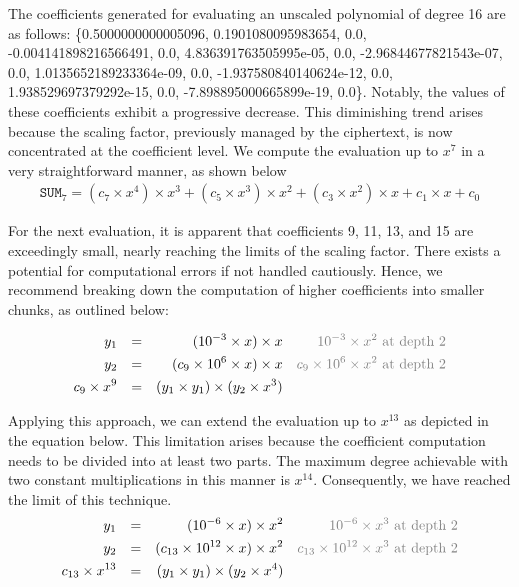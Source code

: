 \documentclass[journal=tosc,final]{iacrtrans}
\begin{document}
The coefficients generated for evaluating an unscaled polynomial of degree 16 are as follows: \{0.5000000000005096, 0.1901080095983654, 0.0, -0.004141898216566491, 0.0, 4.836391763505995e-05, 0.0, -2.96844677821543e-07, 0.0, 1.0135652189233364e-09, 0.0, -1.937580840140624e-12, 0.0, 1.938529697379292e-15, 0.0, -7.898895000665899e-19, 0.0\}. Notably, the values of these coefficients exhibit a progressive decrease. This diminishing trend arises because the scaling factor, previously managed by the ciphertext, is now concentrated at the coefficient level. We compute the evaluation up to $x^7$ in a very straightforward manner, as shown below
\begin{align}
     \texttt{SUM}_7 = (c_7\times x^4)\times x^3 +(c_5\times x^3)\times x^2 +(c_3\times x^2)\times x + c_1\times x+ c_0 
\end{align}

For the next evaluation, it is apparent that coefficients 9, 11, 13, and 15 are exceedingly small, nearly reaching the limits of the scaling factor. There exists a potential for computational errors if not handled cautiously. Hence, we recommend breaking down the computation of higher coefficients into smaller chunks, as outlined below:

\begin{align}
    y_1 && = && (10^{-3}\times x )\times x && \text{\textcolor{gray}{$10^{-3}\times x^2$ at depth 2}}\\
    y_2 && = && (c_9\times 10^{6} \times x )\times x && \text{\textcolor{gray}{$c_9 \times 10^{6}\times x^2$ at depth 2}}\\
    c_9\times x^9 && = && (y_1\times y_1) \times (y_2\times x^3) &&
\end{align}

Applying this approach, we can extend the evaluation up to $x^{13}$ as depicted in the equation below. This limitation arises because the coefficient computation needs to be divided into at least two parts. The maximum degree achievable with two constant multiplications in this manner is $x^{14}$. Consequently, we have reached the limit of this technique. 
\begin{align}
    y_1 && = && (10^{-6}\times x )\times x^2 && \text{\textcolor{gray}{$10^{-6}\times x^3$ at depth 2}}\\
    y_2 && = && (c_{13}\times 10^{12} \times x )\times x^2 && \text{\textcolor{gray}{$c_{13} \times 10^{12}\times x^3$ at depth 2}}\\
    c_{13}\times x^{13} && = && (y_1\times y_1) \times (y_2\times x^4) &&
\end{align}
\end{document}
